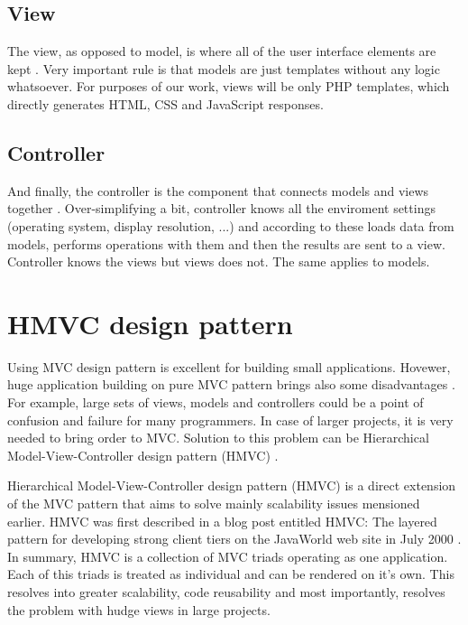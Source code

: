 \subsection{View}

The view, as opposed to model, is where all of the user interface elements are kept \cite{phpmvc}. Very important rule is that models are just templates without any logic whatsoever. For purposes of our work, views will be only PHP templates, which directly generates HTML, CSS and JavaScript responses.

\subsection{Controller}

And finally, the controller is the component that connects models and views together \cite{phpmvc}. Over-simplifying a bit, controller knows all the enviroment settings (operating system, display resolution, ...) and according to these loads data from models, performs operations with them and then the results are sent to a view. Controller knows the views but views does not. The same applies to models.


\section{HMVC design pattern}

Using MVC design pattern is excellent for building small applications. Hovewer, huge application building on pure MVC pattern brings also some disadvantages \cite{culik}. For example, large sets of views, models and controllers could be a point of confusion and failure for many programmers. In case of larger projects, it is very needed to bring order to MVC. Solution to this problem can be Hierarchical Model-View-Controller design pattern (HMVC) \cite{hmvc}.



Hierarchical Model-View-Controller design pattern (HMVC) is a direct extension of the MVC pattern that aims to solve mainly scalability issues mensioned earlier. HMVC was first described in a blog post entitled HMVC: The layered pattern for developing strong client tiers on the JavaWorld web site in July 2000 \cite{hmvc}. In summary, HMVC is a collection of MVC triads operating as one application. Each of this triads is treated as individual and can be rendered on it's own. This resolves into greater scalability, code reusability and most importantly, resolves the problem with hudge views in large projects.

